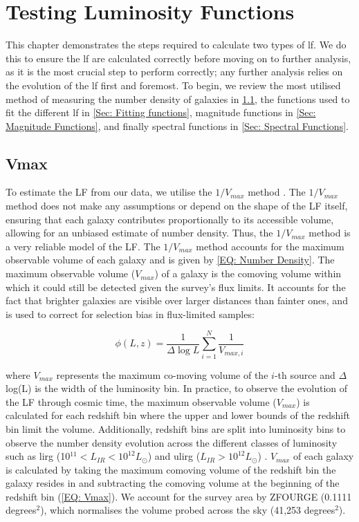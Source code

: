 \chapter{Testing Luminosity Functions} \label{Sec: Luminosity Functions Chapter}
\thispagestyle{empty}

This chapter demonstrates the steps required to calculate two types of \gls{lf}. We do this to ensure the \gls{lf} are calculated correctly before moving on to further analysis, as it is the most crucial step to perform correctly; any further analysis relies on the evolution of the \gls{lf} first and foremost. To begin, we review the most utilised method of measuring the number density of galaxies in \cref{Sec: Vmax}, the functions used to fit the different \gls{lf} in \cref{Sec: Fitting functions}, magnitude functions in \cref{Sec: Magnitude Functions}, and finally spectral functions in \cref{Sec: Spectral Functions}.  

\section{Vmax} \label{Sec: Vmax}
To estimate the LF from our data, we utilise the $1/V_{max}$ method \citep{schmidt_space_1968}. The $1/V_{max}$ method does not make any assumptions or depend on the shape of the LF itself, ensuring that each galaxy contributes proportionally to its accessible volume, allowing for an unbiased estimate of number density. Thus, the $1/V_{max}$ method is a very reliable model of the LF. The $1/V_{max}$ method accounts for the maximum observable volume of each galaxy and is given by \cref{EQ: Number Density}. The maximum observable volume ($V_{max}$) of a galaxy is the comoving volume within which it could still be detected given the survey’s flux limits. It accounts for the fact that brighter galaxies are visible over larger distances than fainter ones, and is used to correct for selection bias in flux-limited samples:

\begin{equation}
    \label{EQ: Number Density}
    \phi(L,z) = \frac{1}{\Delta \log L}\sum_{i=1}^N \frac{1}{V_{max,i}}
\end{equation}

where $V_{max}$ represents the maximum co-moving volume of the $i$-th source and $\Delta$ log(L) is the width of the luminosity bin. In practice, to observe the evolution of the LF through cosmic time, the maximum observable volume ($V_{max}$) is calculated for each redshift bin where the upper and lower bounds of the redshift bin limit the volume. Additionally, redshift bins are split into luminosity bins to observe the number density evolution across the different classes of luminosity such as \gls{lirg} (10$^{11} < L_{IR} < 10^{12} L_{\odot}$) and \gls{ulirg} ($L_{IR} > 10^{12} L_{\odot}$) \citep{valiante_backward_2009}. $V_{max}$ of each galaxy is calculated by taking the maximum comoving volume of the redshift bin the galaxy resides in and subtracting the comoving volume at the beginning of the redshift bin (\cref{EQ: Vmax}). We account for the survey area by ZFOURGE (0.1111 degrees$^2$), which normalises the volume probed across the sky (41,253 degrees$^2$). 

